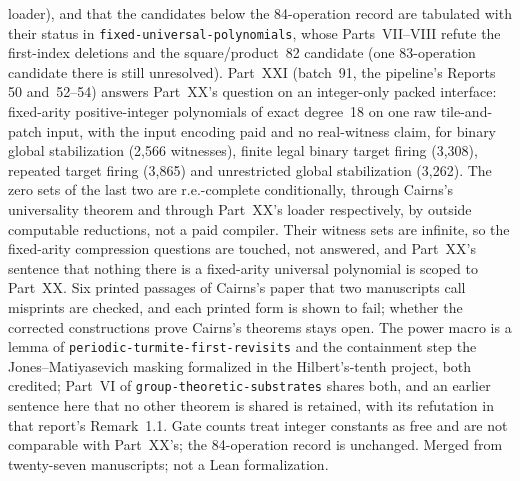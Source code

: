 \documentclass[11pt]{article}
\newcommand{\dir}[1]{\texttt{#1}}
\begin{document}
{loader), and that the candidates below the 84-operation record are
tabulated with their status in \dir{fixed-universal-polynomials}, whose
Parts~VII--VIII refute the first-index deletions and the square/product~82
candidate (one 83-operation candidate there is still unresolved).
Part~XXI (batch~91, the pipeline's Reports 50 and~52--54) answers Part~XX's
question on an integer-only packed interface: fixed-arity positive-integer
polynomials of exact degree~18 on one raw tile-and-patch input, with the
input encoding paid and no real-witness claim, for binary global
stabilization (2{,}566 witnesses), finite legal binary target firing
(3{,}308), repeated target firing (3{,}865) and unrestricted global
stabilization (3{,}262).  The zero sets of the last two are r.e.-complete
conditionally, through Cairns's universality theorem and through Part~XX's
loader respectively, by outside computable reductions, not a paid compiler.
Their witness sets are infinite, so the fixed-arity compression questions
are touched, not answered, and Part~XX's sentence that nothing there is a
fixed-arity universal polynomial is scoped to Part~XX.  Six printed passages
of Cairns's paper that two manuscripts call misprints are checked, and each
printed form is shown to fail; whether the corrected constructions prove
Cairns's theorems stays open.  The power macro is a lemma of
\dir{periodic-turmite-first-revisits} and the containment step the
Jones--Matiyasevich masking formalized in the Hilbert's-tenth project, both
credited; Part~VI of \dir{group-theoretic-substrates} shares both, and an
earlier sentence here that no other theorem is shared is retained, with
its refutation in that report's Remark~1.1.  Gate counts treat integer constants as free and are not
comparable with Part~XX's; the 84-operation record is unchanged.  Merged
from twenty-seven manuscripts;
not a Lean formalization.}
\end{document}
